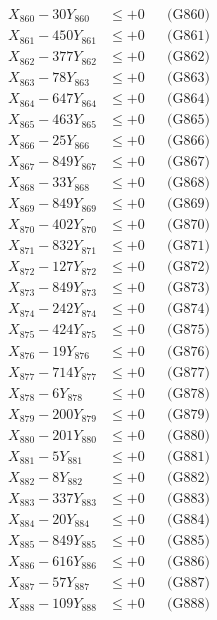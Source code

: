 \documentclass[a4paper,10pt]{article}
\begin{document}
{\begin{align}
X_{860} - 30Y_{860} &\leq +0 && \text{(G860)} \\
\allowbreak
X_{861} - 450Y_{861} &\leq +0 && \text{(G861)} \\
X_{862} - 377Y_{862} &\leq +0 && \text{(G862)} \\
X_{863} - 78Y_{863} &\leq +0 && \text{(G863)} \\
X_{864} - 647Y_{864} &\leq +0 && \text{(G864)} \\
X_{865} - 463Y_{865} &\leq +0 && \text{(G865)} \\
X_{866} - 25Y_{866} &\leq +0 && \text{(G866)} \\
X_{867} - 849Y_{867} &\leq +0 && \text{(G867)} \\
X_{868} - 33Y_{868} &\leq +0 && \text{(G868)} \\
X_{869} - 849Y_{869} &\leq +0 && \text{(G869)} \\
X_{870} - 402Y_{870} &\leq +0 && \text{(G870)} \\
\allowbreak
X_{871} - 832Y_{871} &\leq +0 && \text{(G871)} \\
X_{872} - 127Y_{872} &\leq +0 && \text{(G872)} \\
X_{873} - 849Y_{873} &\leq +0 && \text{(G873)} \\
X_{874} - 242Y_{874} &\leq +0 && \text{(G874)} \\
X_{875} - 424Y_{875} &\leq +0 && \text{(G875)} \\
X_{876} - 19Y_{876} &\leq +0 && \text{(G876)} \\
X_{877} - 714Y_{877} &\leq +0 && \text{(G877)} \\
X_{878} - 6Y_{878} &\leq +0 && \text{(G878)} \\
X_{879} - 200Y_{879} &\leq +0 && \text{(G879)} \\
X_{880} - 201Y_{880} &\leq +0 && \text{(G880)} \\
\allowbreak
X_{881} - 5Y_{881} &\leq +0 && \text{(G881)} \\
X_{882} - 8Y_{882} &\leq +0 && \text{(G882)} \\
X_{883} - 337Y_{883} &\leq +0 && \text{(G883)} \\
X_{884} - 20Y_{884} &\leq +0 && \text{(G884)} \\
X_{885} - 849Y_{885} &\leq +0 && \text{(G885)} \\
X_{886} - 616Y_{886} &\leq +0 && \text{(G886)} \\
X_{887} - 57Y_{887} &\leq +0 && \text{(G887)} \\
X_{888} - 109Y_{888} &\leq +0 && \text{(G888)} \\

\end{align}}
\end{document}
